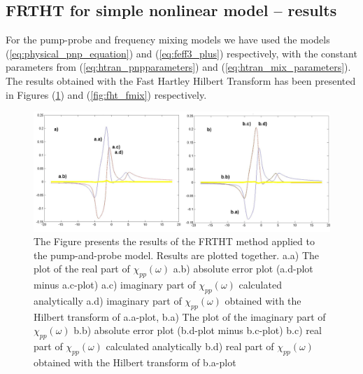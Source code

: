 \documentclass[12pt,twoside,a4paper]{article}
\numberwithin{equation}{subsection}
\numberwithin{figure}{subsection}
\begin{document}
\subsection{FRTHT for simple nonlinear model -- results} \label{chap:hartley_nlo}

For the pump-probe and frequency mixing models we have used the models (\ref{eq:physical_pnp_equation}) and (\ref{eq:feff3_plus}) respectively, with the constant parameters from (\ref{eq:htran_pnpparameters}) and (\ref{eq:htran_mix_parameters}). The results obtained with the Fast Hartley Hilbert Transform has been presented in Figures (\ref{fig:fht_pnp}) and (\ref{fig:fht_fmix}) respectively.

\begin{figure} 
  \includegraphics[width=150mm]{img/fht_pnp.png}
  \caption{The Figure presents the results of the FRTHT method applied to the pump-and-probe model. Results are plotted together.
     a.a) The plot of the real part of ${\chi_{pp}}(\omega )$
     a.b) absolute error plot (a.d-plot minus a.c-plot) 
     a.c) imaginary part of $\chi_{pp}(\omega )$ calculated analytically 
     a.d) imaginary part of $\chi_{pp}(\omega )$ obtained with the Hilbert transform of a.a-plot, 
     b.a) The plot of the imaginary part of $\chi_{pp}(\omega )$ 
     b.b) absolute error plot (b.d-plot minus b.c-plot) 
     b.c) real part of $\chi_{pp} (\omega )$ calculated analytically 
     b.d) real part of $\chi_{pp} (\omega )$ obtained with the Hilbert transform of b.a-plot 
     \label{fig:fht_pnp}
     }
\end{figure} 
\end{document}
